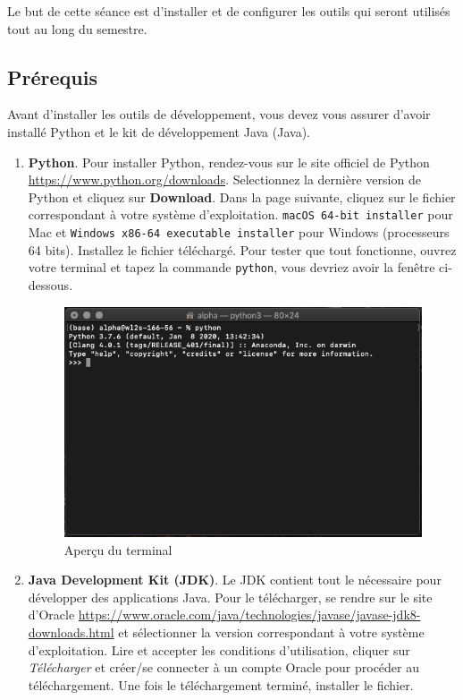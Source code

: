 



\ShowSolutiontrue
\ShowConseiltrue
\titre
{}

Le but de cette séance est d'installer et de configurer les outils qui seront utilisés tout au long du semestre. 

\subsection*{Prérequis}
Avant d'installer les outils de développement, vous devez vous assurer d'avoir installé Python et le kit de développement Java (Java).
\begin{enumerate}
    \item \textbf{Python}. Pour installer Python, rendez-vous sur le site officiel de Python \url{https://www.python.org/downloads}. Selectionnez la dernière version de Python et cliquez sur \textbf{Download}. Dans la page suivante, cliquez sur le fichier correspondant à votre système d'exploitation. \lstinline{macOS 64-bit installer} pour Mac et \lstinline{Windows x86-64 executable installer} pour Windows (processeurs 64 bits). Installez le fichier téléchargé. Pour tester que tout fonctionne, ouvrez votre terminal et tapez la commande \lstinline{python}, vous devriez avoir la fenêtre ci-dessous.
    
    \begin{figure}[h]
        \centering
        \includegraphics[width=1\textwidth]{img/python.png}
        \caption{Aperçu du terminal}
    \end{figure}

    \item \textbf{Java Development Kit (JDK)}. Le JDK contient tout le nécessaire pour développer des applications Java. Pour le télécharger, se rendre sur le site d'Oracle \url{https://www.oracle.com/java/technologies/javase/javase-jdk8-downloads.html} et sélectionner la version correspondant à votre système d'exploitation. Lire et accepter les conditions d'utilisation, cliquer sur \textit{Télécharger} et créer/se connecter à un compte Oracle pour procéder au téléchargement. Une fois le téléchargement terminé, installer le fichier.
\end{enumerate}

